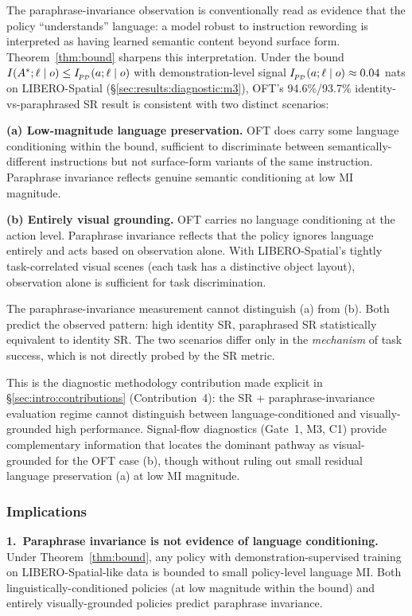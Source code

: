 The paraphrase-invariance observation is conventionally read as evidence that the policy
``understands'' language: a model robust to instruction rewording is interpreted as
having learned semantic content beyond surface form. Theorem~\ref{thm:bound} sharpens
this interpretation. Under the bound $I(A^{*}; \ell \mid o) \le I_{p_{\mathcal{D}}}(a; \ell \mid
o)$ with demonstration-level signal $I_{p_{\mathcal{D}}}(a; \ell \mid o) \approx 0.04$ nats on
LIBERO-Spatial (\S\ref{sec:results:diagnostic:m3}), OFT's 94.6\%/93.7\%
identity-vs-paraphrased SR result is consistent with two distinct scenarios:

\textbf{(a) Low-magnitude language preservation.} OFT does carry some language
conditioning within the bound, sufficient to discriminate between semantically-different
instructions but not surface-form variants of the same instruction. Paraphrase invariance
reflects genuine semantic conditioning at low MI magnitude.

\textbf{(b) Entirely visual grounding.} OFT carries no language conditioning at the
action level. Paraphrase invariance reflects that the policy ignores language entirely
and acts based on observation alone. With LIBERO-Spatial's tightly task-correlated visual
scenes (each task has a distinctive object layout), observation alone is sufficient for
task discrimination.

The paraphrase-invariance measurement cannot distinguish (a) from (b). Both predict the
observed pattern: high identity SR, paraphrased SR statistically equivalent to identity
SR. The two scenarios differ only in the \emph{mechanism} of task success, which is not
directly probed by the SR metric.

This is the diagnostic methodology contribution made explicit in
\S\ref{sec:intro:contributions} (Contribution~4): the SR + paraphrase-invariance
evaluation regime cannot distinguish between language-conditioned and visually-grounded
high performance. Signal-flow diagnostics (Gate~1, M3, C1) provide complementary
information that locates the dominant pathway as visual-grounded for the OFT case (b),
though without ruling out small residual language preservation (a) at low MI magnitude.

\subsubsection{Implications}
\label{sec:results:paraphrase:implications}

\textbf{1.~Paraphrase invariance is not evidence of language conditioning.} Under
Theorem~\ref{thm:bound}, any policy with demonstration-supervised training on
LIBERO-Spatial-like data is bounded to small policy-level language MI. Both
linguistically-conditioned policies (at low magnitude within the bound) and entirely
visually-grounded policies predict paraphrase invariance.

